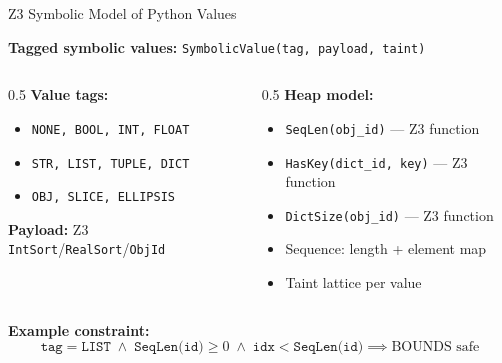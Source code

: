 \documentclass[aspectratio=169]{beamer}
\begin{document}
\begin{frame}{Z3 Symbolic Model of Python Values}

\textbf{Tagged symbolic values:} \texttt{SymbolicValue(tag, payload, taint)}

\begin{columns}[T]
\begin{column}{0.5\textwidth}
\textbf{Value tags:}
\begin{itemize}
  \item \texttt{NONE, BOOL, INT, FLOAT}
  \item \texttt{STR, LIST, TUPLE, DICT}
  \item \texttt{OBJ, SLICE, ELLIPSIS}
\end{itemize}
\vspace{0.3em}
\textbf{Payload:} Z3 \texttt{IntSort}/\texttt{RealSort}/\texttt{ObjId}
\end{column}
\begin{column}{0.5\textwidth}
\textbf{Heap model:}
\begin{itemize}
  \item \texttt{SeqLen(obj\_id)} --- Z3 function
  \item \texttt{HasKey(dict\_id, key)} --- Z3 function
  \item \texttt{DictSize(obj\_id)} --- Z3 function
  \item Sequence: length + element map
  \item Taint lattice per value
\end{itemize}
\end{column}
\end{columns}

\vspace{0.5em}
\textbf{Example constraint:}
\[
  \texttt{tag} = \texttt{LIST} \;\land\; \texttt{SeqLen(id)} \geq 0 \;\land\; \texttt{idx} < \texttt{SeqLen(id)} \implies \text{BOUNDS safe}
\]

\end{frame}
\end{document}
